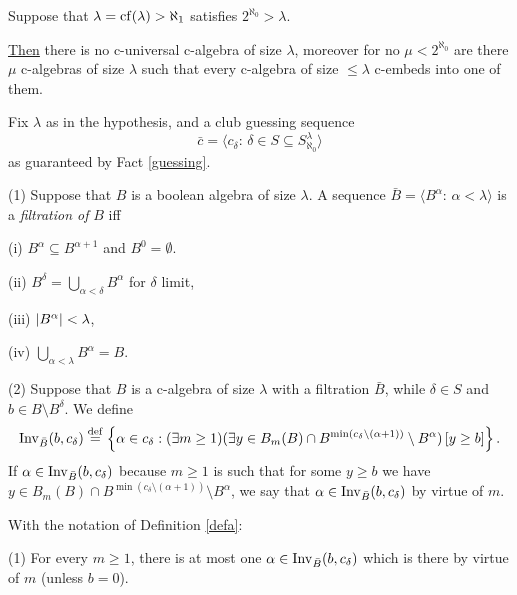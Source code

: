 \begin{Theorem}\label{theorem} Suppose that $\lambda={\rm cf}(\lambda)>\aleph_1$
satisfies $2^{\aleph_0}>\lambda$. 

\underline{Then} there is no c-universal c-algebra of size $\lambda$,
moreover for no $\mu<2^{\aleph_0}$ are there $\mu$ c-algebras
of size $\lambda$ such that every c-algebra of size
$\le\lambda$ c-embeds into one of them.
\end{Theorem}

\begin{Proof} Fix $\lambda$ as in the hypothesis, and a club guessing
sequence
\[
\bar{c}=\langle c_\delta:\,\delta\in S\subseteq S^\lambda_{\aleph_0}\rangle
\]
as guaranteed by Fact \ref{guessing}.

\begin{Definition}\label{defa}
(1) Suppose that $B$ is a boolean algebra of size $\lambda$.
A sequence $\bar{B}=\langle B^\alpha:\,\alpha<\lambda\rangle$ is a
{\em filtration of} $B$ iff
\begin{description}
\item{(i)} $B^\alpha\subseteq B^{\alpha+1}$ and $B^0=\emptyset$.
\item{(ii)} $B^\delta=\bigcup_{\alpha<\delta} B^\alpha$ for $\delta$ limit,
\item{(iii)} ${\vert B^\alpha \vert}<\lambda$,
\item{(iv)} $\bigcup_{\alpha<\lambda} B^\alpha=B$.
\end{description}

{\noindent (2)} Suppose that $B$ is a c-algebra of size $\lambda$ with
a filtration $\bar{B}$, while $\delta\in S$ and
$b\in B\setminus B^\delta$. We define
\[
{\rm Inv}_{\bar{B}}(b,c_\delta)\deq\left\{
\alpha\in c_\delta:(\exists m\ge 1)
(\exists y\in B_m(B)\cap B^{\min(c_\delta\setminus (\alpha+1))}\setminus B^\alpha)
\,[y\ge b]\right\}.
\]
If $\alpha\in {\rm Inv}_{\bar{B}}(b,c_\delta)$ because $m\ge 1$ is such that
for some $y\ge b$ we have $y\in B_m(B)\cap 
B^{\min(c_\delta\setminus (\alpha+1))}\setminus B^\alpha$,
we say
that $\alpha
\in {\rm Inv}_{\bar{B}}(b,c_\delta)$ by virtue of $m$.
\end{Definition}

\begin{Note}\label{observe} With the notation of Definition \ref{defa}:

{\noindent (1)} For every $m\ge 1$, there is at most one $\alpha\in
{\rm Inv}_{\bar{B}}(b,c_\delta)$ which is there by virtue of $m$
(unless $b=0$).


\end{Note}
\end{Proof}
